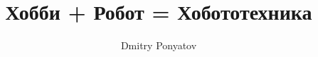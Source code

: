 

\author{Dmitry Ponyatov }
\title{Хобби + Робот = Хобототехника}



%
\maketitle
\tableofcontents



